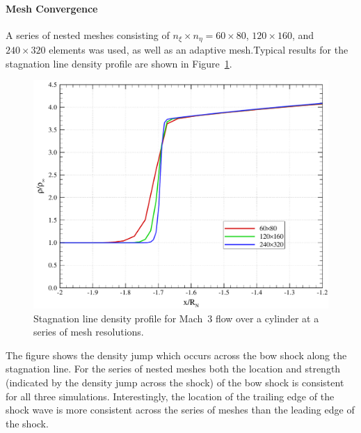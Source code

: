 \paragraph{Mesh Convergence}
A series of nested meshes consisting of $n_\xi\times n_\eta=60\times 80$, $120\times 160$, and $240\times 320$ elements was used, as well as an adaptive mesh.Typical results for the stagnation line density profile are shown in Figure~\ref{fig:cyl_meshconv}.
\begin{figure}[hbtp]
  \begin{center}
    \includegraphics[width=\textwidth]{figures/mach3_cylinder/rho_mesh_convergence}
    \caption{Stagnation line density profile for Mach~3 flow over a cylinder at a series of mesh resolutions.\label{fig:cyl_meshconv}}
  \end{center}
\end{figure}
  The figure shows the density jump which occurs across the bow shock along the stagnation line.  For the series of nested meshes both the location and strength (indicated by the density jump across the shock) of the bow shock is consistent for all three simulations.  Interestingly, the location of the trailing edge of the shock wave is more consistent across the series of meshes than the leading edge of the shock.  
